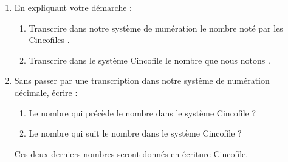 \begin{exercice}
\begin{enumerate}
      \item En expliquant votre démarche :
      \begin{enumerate}
         \item Transcrire dans notre système de numération le nombre noté par les Cincofiles \og {}   \fg.
         \item Transcrire dans le système Cincofile le nombre que nous notons  \fg.
      \end{enumerate}
      \item Sans passer par une transcription dans notre système de numération décimale, écrire :
      \begin{enumerate}
         \item Le nombre qui précède le nombre \og {}   \fg{} dans le système Cincofile ?
         \item Le nombre qui suit le nombre \og {}   \fg{} dans le système Cincofile ?
      \end{enumerate}
       Ces deux derniers nombres seront donnés en écriture Cincofile.
   \end{enumerate}
\end{exercice}

